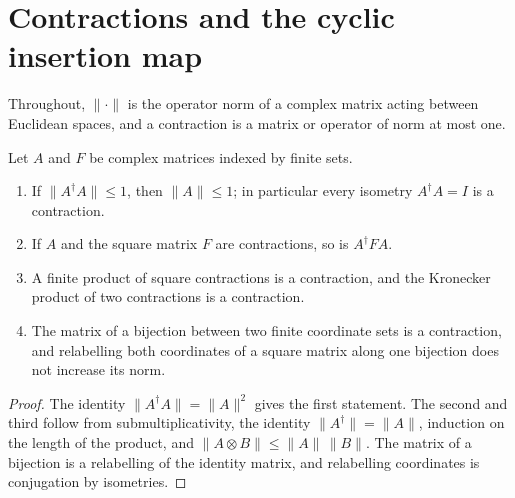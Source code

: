 \section{Contractions and the cyclic insertion map}

Throughout, $\lVert\cdot\rVert$ is the operator norm of a complex matrix acting
between Euclidean spaces, and a contraction is a matrix or operator of norm at
most one.

\begin{lemma}
    \label{lem:matrix_l2_contractions}
    \leanok
    Let $A$ and $F$ be complex matrices indexed by finite sets.
    \begin{enumerate}
        \item If $\lVert A^\dagger A\rVert\le1$, then $\lVert A\rVert\le1$; in
              particular every isometry $A^\dagger A=I$ is a contraction.
        \item If $A$ and the square matrix $F$ are contractions, so is
              $A^\dagger FA$.
        \item A finite product of square contractions is a contraction, and
              the Kronecker product of two contractions is a contraction.
        \item The matrix of a bijection between two finite coordinate sets is a
              contraction, and relabelling both coordinates of a square matrix
              along one bijection does not increase its norm.
    \end{enumerate}
\end{lemma}

\begin{proof}\leanok
    The identity $\lVert A^\dagger A\rVert=\lVert A\rVert^2$ gives the first
    statement. The second and third follow from submultiplicativity, the
    identity $\lVert A^\dagger\rVert=\lVert A\rVert$, induction on the length
    of the product, and $\lVert A\otimes B\rVert\le\lVert A\rVert\,\lVert B\rVert$.
    The matrix of a bijection is a relabelling of the identity matrix, and
    relabelling coordinates is conjugation by isometries.
\end{proof}

